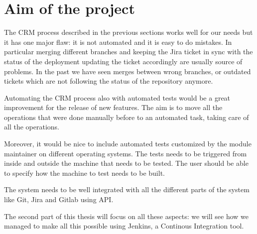 \section{Aim of the project}

The CRM process described in the previous sections works well for our
needs but it has one major flaw: it is not automated and it is easy to do
mistakes. In particular merging different branches and keeping the Jira
ticket in sync with the status of the deployment updating the ticket
accordingly are usually source of problems. In the past we have seen
merges between wrong branches, or outdated tickets which are not following
the status of the repository anymore.

Automating the CRM process also with automated tests would be a great
improvement for the release of new features. The aim is to move all the
operations that were done manually before to an automated task, taking
care of all the operations.

Moreover, it would be nice to include automated tests customized by the
module maintainer on different operating systems. The tests needs to be
triggered from inside and outside the machine that needs to be tested. The
user should be able to specify how the machine to test needs to be built.

The system needs to be well integrated with all the different parts of the
system like Git, Jira and Gitlab using API.

The second part of this thesis will focus on all these aspects: we will
see how we managed to make all this possible using Jenkins, a Continous
Integration tool.
